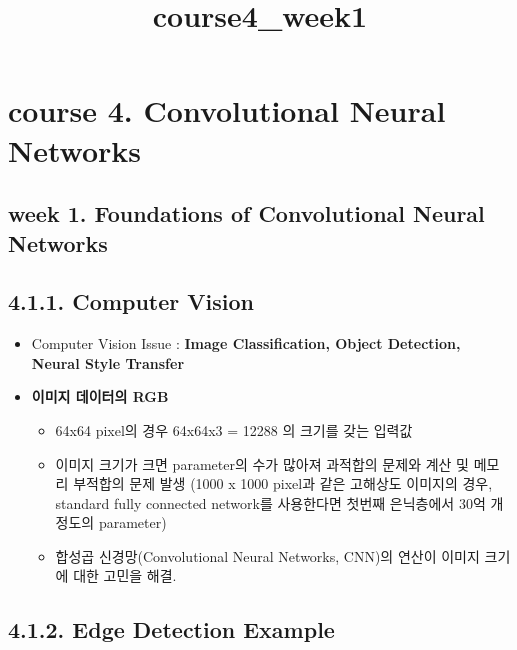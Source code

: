 \documentclass[11pt]{article}
\title{course4\_week1}
\providecommand{\tightlist}{%
      \setlength{\itemsep}{0pt}\setlength{\parskip}{0pt}}
\begin{document}
    
    
    \maketitle
    
    

    
    \section{course 4. Convolutional Neural
Networks}\label{course-4.-convolutional-neural-networks}

\subsection{week 1. Foundations of Convolutional Neural
Networks}\label{week-1.-foundations-of-convolutional-neural-networks}

\subsection{4.1.1. Computer Vision}\label{computer-vision}

\begin{itemize}
\tightlist
\item
  Computer Vision Issue : \textbf{Image Classification, Object
  Detection, Neural Style Transfer}
\item
  \textbf{이미지 데이터의 RGB}

  \begin{itemize}
  \tightlist
  \item
    64x64 pixel의 경우 64x64x3 = 12288 의 크기를 갖는 입력값
  \item
    이미지 크기가 크면 parameter의 수가 많아져 과적합의 문제와 계산 및
    메모리 부적합의 문제 발생 (1000 x 1000 pixel과 같은 고해상도
    이미지의 경우,\\
    standard fully connected network를 사용한다면 첫번째 은닉층에서 30억
    개 정도의 parameter)
  \item
    합성곱 신경망(Convolutional Neural Networks, CNN)의 연산이 이미지
    크기에 대한 고민을 해결. 
  \end{itemize}
\end{itemize}

    \subsection{4.1.2. Edge Detection Example}\label{edge-detection-example}
\end{document}
